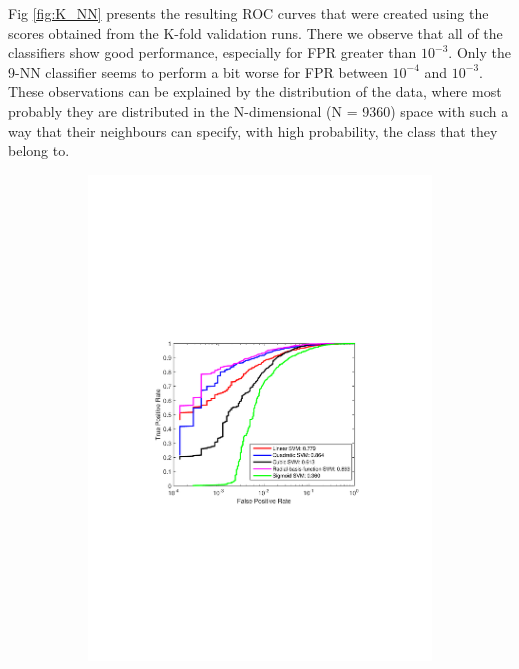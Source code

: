 \noindent Fig \ref{fig:K_NN} presents the resulting ROC curves that were created using the scores obtained from the K-fold validation runs. There we observe that all of the classifiers show good performance, especially for FPR greater than $10^{-3}$. Only the 9-NN classifier seems to perform a bit worse for FPR between $10^{-4}$ and $10^{-3}$. These observations can be explained by the distribution of the data, where most probably they are distributed in the N-dimensional (N = 9360) space with such a way that their neighbours can specify, with high probability, the class that they belong to.

\begin{figure}[h]
  \centering
  \begin{subfigure}[b]{0.49\textwidth}
   \includegraphics[width=\textwidth]{figures/SVM.pdf}
    \caption{}
    \label{fig:SVM}
  \end{subfigure}

\end{figure}
